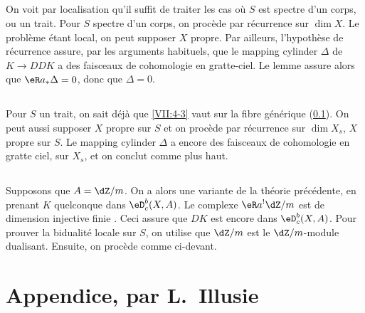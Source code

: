 \subsection{}\label{VII:4-5}

On voit par localisation qu'il suffit de traiter les cas où $S$ est spectre 
d'un corps, ou un trait. Pour $S$ spectre d'un corps, on procède par 
récurrence sur $\dim X$. Le problème étant local, on peut supposer $X$ 
propre. Par ailleurs, l'hypothèse de récurrence assure, par les arguments 
habituels, que le mapping cylinder $\Delta$ de $K\to D D K$ a des faisceaux de 
cohomologie en gratte-ciel. Le lemme assure alors que $\eR a_\ast \Delta=0$, 
donc que $\Delta=0$. 





\subsection{}\label{VII:4-6}

Pour $S$ un trait, on sait déjà que \ref{VII:4-3} vaut sur la fibre 
générique (\ref{VII:4-5}). On peut aussi supposer $X$ propre sur $S$ et on 
procède par récurrence sur $\dim{X_s}$, $X$ propre sur $S$. Le mapping 
cylinder $\Delta$ a encore des faisceaux de cohomologie en gratte ciel, sur 
$X_s$, et on conclut comme plus haut. 





\subsection{}\label{VII:4-7}

Supposons que $A=\dZ/m$. On a alors une variante de la théorie 
précédente, en prenant $K$ quelconque dans $\eD_c^b(X,A)$. Le complexe 
$\eR a^! \dZ/m$ est de dimension injective finie . Ceci 
assure que $D K$ est encore dans $\eD_c^b(X,A)$. Pour prouver la bidualité 
locale sur $S$, on utilise que $\dZ/m$ est le $\dZ/m$-module dualisant. 
Ensuite, on procède comme ci-devant. 










\section{Appendice, par L.\ Illusie}\label{VII:5}

